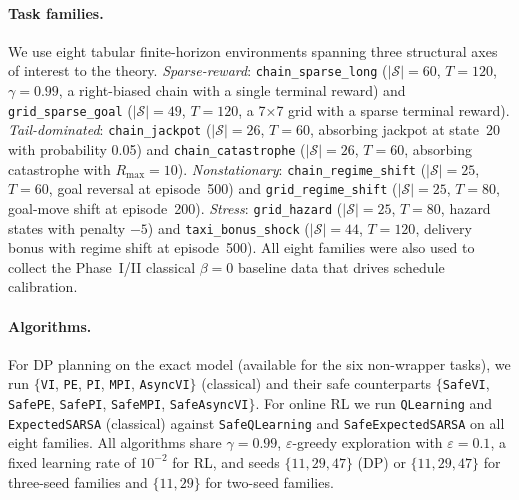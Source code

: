 \documentclass{article}
\theoremstyle{remark}
\begin{document}
\paragraph{Task families.}
We use eight tabular finite-horizon environments spanning three structural axes of interest to the theory.
\emph{Sparse-reward}: \texttt{chain\_sparse\_long} ($|\mathcal{S}|=60$, $T=120$, $\gamma=0.99$, a right-biased chain with a single terminal reward) and \texttt{grid\_sparse\_goal} ($|\mathcal{S}|=49$, $T=120$, a 7$\times$7 grid with a sparse terminal reward).
\emph{Tail-dominated}: \texttt{chain\_jackpot} ($|\mathcal{S}|=26$, $T=60$, absorbing jackpot at state~20 with probability 0.05) and \texttt{chain\_catastrophe} ($|\mathcal{S}|=26$, $T=60$, absorbing catastrophe with $R_{\max}=10$).
\emph{Nonstationary}: \texttt{chain\_regime\_shift} ($|\mathcal{S}|=25$, $T=60$, goal reversal at episode~500) and \texttt{grid\_regime\_shift} ($|\mathcal{S}|=25$, $T=80$, goal-move shift at episode~200).
\emph{Stress}: \texttt{grid\_hazard} ($|\mathcal{S}|=25$, $T=80$, hazard states with penalty $-5$) and \texttt{taxi\_bonus\_shock} ($|\mathcal{S}|=44$, $T=120$, delivery bonus with regime shift at episode~500).
All eight families were also used to collect the Phase~I/II classical $\beta=0$ baseline data that drives schedule calibration.

\paragraph{Algorithms.}
For DP planning on the exact model (available for the six non-wrapper tasks), we run
$\{$\texttt{VI}, \texttt{PE}, \texttt{PI}, \texttt{MPI}, \texttt{AsyncVI}$\}$ (classical) and their safe counterparts
$\{$\texttt{SafeVI}, \texttt{SafePE}, \texttt{SafePI}, \texttt{SafeMPI}, \texttt{SafeAsyncVI}$\}$.
For online RL we run \texttt{QLearning} and \texttt{ExpectedSARSA} (classical) against \texttt{SafeQLearning} and \texttt{SafeExpectedSARSA} on all eight families.
All algorithms share $\gamma=0.99$, $\varepsilon$-greedy exploration with $\varepsilon=0.1$, a fixed learning rate of $10^{-2}$ for RL, and seeds $\{11, 29, 47\}$ (DP) or $\{11, 29, 47\}$ for three-seed families and $\{11, 29\}$ for two-seed families.
\end{document}
